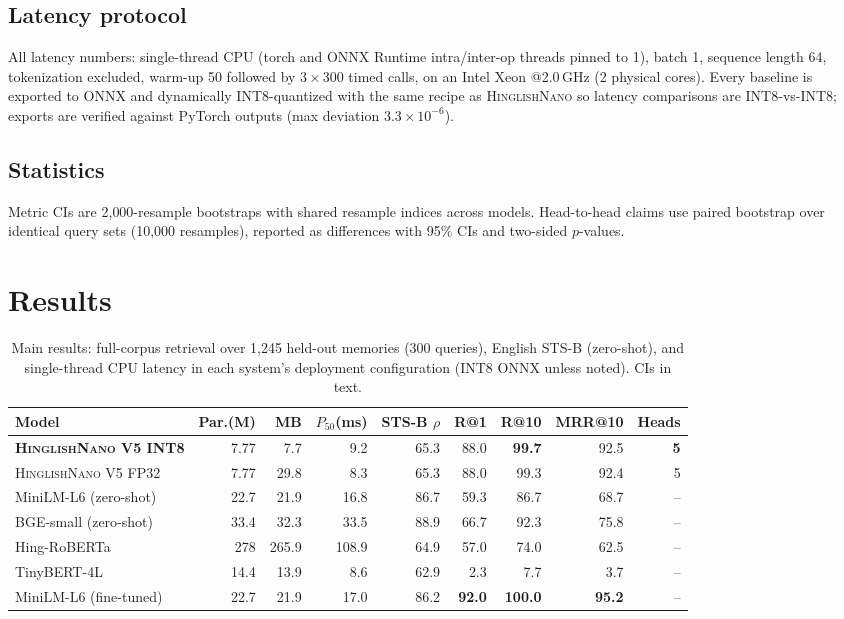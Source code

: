 \documentclass[11pt]{article}
\newcommand{\nano}{\textsc{HinglishNano}}
\begin{document}
\subsection{Latency protocol}
All latency numbers: single-thread CPU (torch and ONNX Runtime intra/inter-op threads pinned to 1), batch 1, sequence length 64, tokenization excluded, warm-up 50 followed by $3\times300$ timed calls, on an Intel Xeon @2.0\,GHz (2 physical cores). Every baseline is exported to ONNX and dynamically INT8-quantized with the same recipe as \nano{} so latency comparisons are INT8-vs-INT8; exports are verified against PyTorch outputs (max deviation $3.3\times10^{-6}$).

\subsection{Statistics}
Metric CIs are 2{,}000-resample bootstraps with shared resample indices across models. Head-to-head claims use paired bootstrap over identical query sets (10{,}000 resamples), reported as differences with 95\% CIs and two-sided $p$-values.

\section{Results}

\begin{table}[t]
\centering\small
\caption{Main results: full-corpus retrieval over 1{,}245 held-out memories (300 queries), English STS-B (zero-shot), and single-thread CPU latency in each system's deployment configuration (INT8 ONNX unless noted). CIs in text.}
\label{tab:main}
\begin{tabular}{lrrrrrrrr}
\toprule
Model & Par.(M) & MB & $P_{50}$(ms) & STS-B $\rho$ & R@1 & R@10 & MRR@10 & Heads \\
\midrule
\textbf{\nano{} V5 INT8} & 7.77 & 7.7 & 9.2 & 65.3 & 88.0 & \textbf{99.7} & 92.5 & \textbf{5} \\
\nano{} V5 FP32 & 7.77 & 29.8 & 8.3 & 65.3 & 88.0 & 99.3 & 92.4 & 5 \\
MiniLM-L6 (zero-shot) & 22.7 & 21.9 & 16.8 & 86.7 & 59.3 & 86.7 & 68.7 & -- \\
BGE-small (zero-shot) & 33.4 & 32.3 & 33.5 & 88.9 & 66.7 & 92.3 & 75.8 & -- \\
Hing-RoBERTa & 278 & 265.9 & 108.9 & 64.9 & 57.0 & 74.0 & 62.5 & -- \\
TinyBERT-4L & 14.4 & 13.9 & 8.6 & 62.9 & 2.3 & 7.7 & 3.7 & -- \\
MiniLM-L6 (fine-tuned) & 22.7 & 21.9 & 17.0 & 86.2 & \textbf{92.0} & \textbf{100.0} & \textbf{95.2} & -- \\
\bottomrule
\end{tabular}
\end{table}
\end{document}
